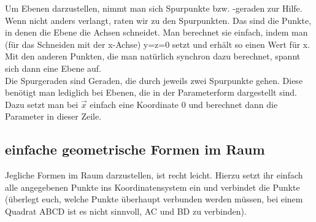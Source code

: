 		Um Ebenen darzustellen, nimmt man sich Spurpunkte bzw. -geraden zur Hilfe.
		Wenn nicht anders verlangt, raten wir zu den Spurpunkten. Das sind die Punkte,
		in denen die Ebene die Achsen schneidet. Man berechnet sie einfach, indem man
		(für das Schneiden mit der x-Achse) y=z=0 setzt und erhält so einen Wert für
		x. Mit den anderen Punkten, die man natürlich synchron dazu berechnet, spannt
		sich dann eine Ebene auf.\\
		Die Spurgeraden sind Geraden, die durch jeweils zwei Spurpunkte gehen. Diese
		benötigt man lediglich bei Ebenen, die in der Parameterform dargestellt sind.
		Dazu setzt man bei \(\vec{x}\) einfach eine Koordinate 0 und berechnet dann
		die Parameter in dieser Zeile.

	\subsection{einfache geometrische Formen im Raum}
		Jegliche Formen im Raum darzustellen, ist recht leicht. Hierzu setzt ihr
		einfach alle angegebenen Punkte ins Koordinatensystem ein und verbindet die
		Punkte (überlegt euch, welche Punkte überhaupt verbunden werden müssen, bei
		einem Quadrat ABCD ist es nicht sinnvoll, AC und BD zu verbinden).

